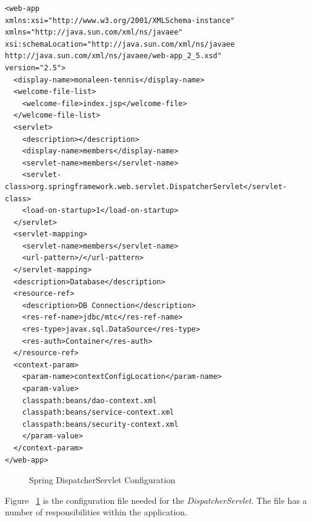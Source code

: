 \begin{lstlisting}
<web-app 
xmlns:xsi="http://www.w3.org/2001/XMLSchema-instance" 
xmlns="http://java.sun.com/xml/ns/javaee" 
xsi:schemaLocation="http://java.sun.com/xml/ns/javaee http://java.sun.com/xml/ns/javaee/web-app_2_5.xsd" 
version="2.5">
  <display-name>monaleen-tennis</display-name>
  <welcome-file-list>
    <welcome-file>index.jsp</welcome-file>
  </welcome-file-list>
  <servlet>
    <description></description>
    <display-name>members</display-name>
    <servlet-name>members</servlet-name>
    <servlet-class>org.springframework.web.servlet.DispatcherServlet</servlet-class>
    <load-on-startup>1</load-on-startup>
  </servlet>
  <servlet-mapping>
    <servlet-name>members</servlet-name>
    <url-pattern>/</url-pattern>
  </servlet-mapping>
  <description>Database</description>
  <resource-ref>
    <description>DB Connection</description>
    <res-ref-name>jdbc/mtc</res-ref-name>
    <res-type>javax.sql.DataSource</res-type>
    <res-auth>Container</res-auth>
  </resource-ref>
  <context-param>
    <param-name>contextConfigLocation</param-name>
    <param-value>
	classpath:beans/dao-context.xml
	classpath:beans/service-context.xml
	classpath:beans/security-context.xml
	</param-value>
  </context-param>
</web-app>
\end{lstlisting}
\begin{figure}[H]
\caption{Spring DispatcherServlet Configuration}
\label{fig:webxml}
\end{figure}

Figure ~\ref{fig:webxml} is the configuration file needed for the \textit{DispatcherServlet}. The file has a number of responsibilities within the application.

